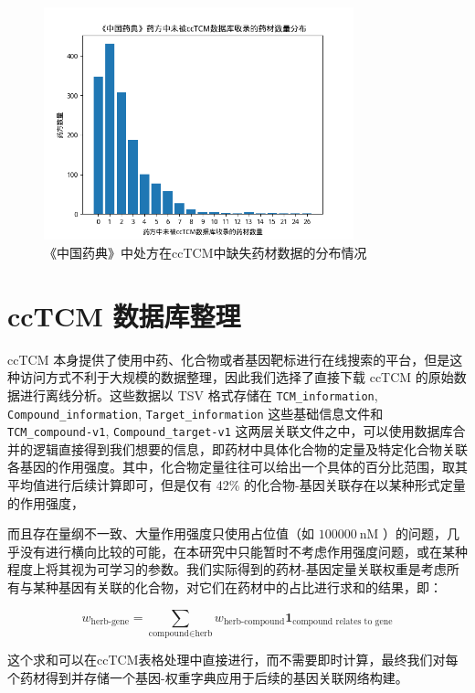 \begin{figure}[H]
  \centering
  \includegraphics[width=0.8\textwidth]{figures/unlisted_medicinals_distribution.png}
  \caption{《中国药典》中处方在ccTCM中缺失药材数据的分布情况}
  \label{fig:missing_herbs}
\end{figure}

\section{ccTCM 数据库整理}

ccTCM 本身提供了使用中药、化合物或者基因靶标进行在线搜索的平台，但是这种访问方式不利于大规模的数据整理，因此我们选择了直接下载 ccTCM 的原始数据进行离线分析。这些数据以 TSV 格式存储在 \texttt{TCM\_information}, \texttt{Compound\_information}, \texttt{Target\_information} 这些基础信息文件和 \texttt{TCM\_compound-v1}, \texttt{Compound\_target-v1} 这两层关联文件之中，可以使用数据库合并的逻辑直接得到我们想要的信息，即药材中具体化合物的定量及特定化合物关联各基因的作用强度。其中，化合物定量往往可以给出一个具体的百分比范围，取其平均值进行后续计算即可，但是仅有 42\% 的化合物-基因关联存在以某种形式定量的作用强度，

而且存在量纲不一致、大量作用强度只使用占位值（如 $100000~\mathrm{nM}$ ）的问题，几乎没有进行横向比较的可能，在本研究中只能暂时不考虑作用强度问题，或在某种程度上将其视为可学习的参数。我们实际得到的药材-基因定量关联权重是考虑所有与某种基因有关联的化合物，对它们在药材中的占比进行求和的结果，即：


$$
w_{\text{herb-gene}} = \sum_{\text{compound} \in \text{herb}} w_{\text{herb-compound}} \mathbf{1}_{\text{compound relates to gene}}
$$

这个求和可以在ccTCM表格处理中直接进行，而不需要即时计算，最终我们对每个药材得到并存储一个基因-权重字典应用于后续的基因关联网络构建。

